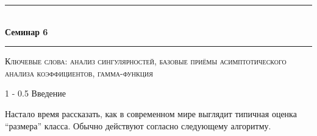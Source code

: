 \documentclass[a5paper]{article}
\makeatletter
\def \topic {Семинар 6}
\theoremstyle{definition}
\renewcommand{\section}{\@startsection
{section}%
{1}%
{\z@}%
{-\baselineskip}%
{0.5\baselineskip}%
{\centering\large\scshape}} %
\makeatother
\begin{document}
\begin{center}

\newcommand{\HRule}{\rule{\linewidth}{0.5mm}}
\HRule \\[0.2cm]
{ \Large \bfseries \topic} %
\HRule

\end{center}

\textsc{Ключевые слова: анализ сингулярностей,
базовые приёмы асимптотического анализа коэффициентов,
гамма-функция}

\section{Введение}

Настало время рассказать, как в современном мире выглядит типичная оценка
``размера'' класса. Обычно действуют согласно следующему алгоритму.
\end{document}
